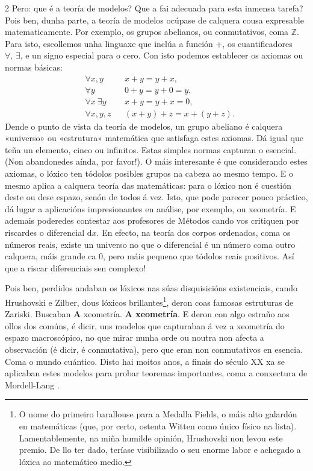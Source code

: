 \begin{multicols}{2}
Pero: que é a teoría de modelos? Que a fai adecuada para esta inmensa tarefa?
Pois ben, dunha parte, a teoría de modelos ocúpase de calquera cousa
expresable matematicamente. Por exemplo, os grupos abelianos, ou conmutativos,
coma $\mathbb{Z}$. Para isto, escollemos unha linguaxe que inclúa a función +,
os cuantificadores $\forall,\, \exists$, e un signo especial para o cero. Con
isto podemos establecer os axiomas ou normas básicas:
%
\begin{align*}
    &\forall x,y          & & x+y=y+x,\\
    &\forall y            & & 0+y=y+0=y,\\
    &\forall x\ \exists y & & x+y=y+x=0,\\
    &\forall x,y,z        & & (x+y)+z=x+(y+z).
\end{align*}
%
Dende o punto de vista da teoría de modelos, un grupo abeliano é calquera
«universo» ou «estrutura» matemática que satisfaga estes axiomas. Dá igual
que teña un elemento, cinco ou infinitos. Estas simples normas capturan o
esencial. (Non abandonedes aínda, por favor!). O máis interesante é que
considerando estes axiomas, o lóxico ten tódolos posibles grupos na cabeza ao
mesmo tempo. E o mesmo aplica a calquera teoría das matemáticas: para o lóxico
non é cuestión deste ou dese espazo, senón de todos á vez. Isto, que pode
parecer pouco práctico, dá lugar a aplicacións impresionantes en análise, por
exemplo, ou xeometría. E ademais poderedes contestar aos profesores de Métodos
cando vos critiquen por riscardes o diferencial $\text{d}x$. En efecto, na teoría dos
corpos ordenados, coma os números reais, existe un universo no que o
diferencial é un número coma outro calquera, máis grande ca $0$, pero máis
pequeno que tódolos reais positivos. Así que a riscar diferenciais sen
complexo!

Pois ben, perdidos andaban os lóxicos nas súas disquisicións existenciais,
cando Hrushovski e Zilber, dous lóxicos brillantes\footnote{O nome do primeiro
barallouse para a Medalla Fields, o máis alto galardón en matemáticas (que, por
certo, ostenta Witten como único físico na lista). Lamentablemente, na miña
humilde opinión, Hrushovski non levou este premio. De llo ter dado, teríase
visibilizado o seu enorme labor e achegado a lóxica ao matemático medio.},
deron coas famosas estruturas de Zariski. Buscaban \textbf{A} xeometría.
\textbf{A xeometría}. E deron con algo estraño aos ollos dos comúns, é dicir,
uns modelos que capturaban á vez a xeometría do espazo macroscópico, no que
mirar nunha orde ou noutra non afecta a observación (é dicir, é conmutativa),
pero que eran non conmutativos en esencia. Coma o mundo cuántico. Disto hai
moitos anos, a finais do século XX xa se aplicaban estes modelos para probar
teoremas importantes, coma a conxectura de Mordell-Lang \cite{Ehud_1996}.


\end{multicols}
